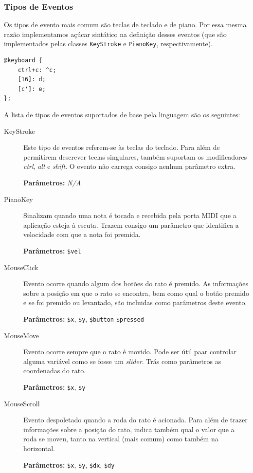 \subsubsection{Tipos de Eventos}
Os tipos de evento mais comum são teclas de teclado e de piano. Por essa mesma razão implementamos açúcar sintático na definição desses eventos  (que são implementados pelas classes \texttt{KeyStroke} e \texttt{PianoKey}, respectivamente).

\begin{lstlisting}[caption={Declaração de três eventos, o primeiro é uma combinação de teclas, o segundo referência o \textit{virtual key code}, e o terceiro uma nota MIDI}]
@keyboard {
    ctrl+c: ^c;
    [16]: d;
    [c']: e;
};
\end{lstlisting}

A lista de tipos de eventos suportados de base pela linguagem são os seguintes:
\begin{description}
 \item[KeyStroke]
 Este tipo de eventos referem-se às teclas do teclado. Para além de permitirem descrever teclas singulares, também suportam os modificadores \textit{ctrl}, \textit{alt} e \textit{shift}. O evento não carrega consigo nenhum parâmetro extra.
 
 \textbf{Parâmetros:} \textit{N/A}
 \item[PianoKey] Sinalizam quando uma nota é tocada e recebida pela porta MIDI que a aplicação esteja à escuta. Trazem consigo um parâmetro que identifica a velocidade com que a nota foi premida.
 
 \textbf{Parâmetros:} \texttt{\$vel}
 \item[MouseClick] Evento ocorre quando algum dos botões do rato é premido. As informações sobre a posição em que o rato se encontra, bem como qual o botão premido e se foi premido ou levantado, são incluidas como parâmetros deste evento.
 
 \textbf{Parâmetros:} \texttt{\$x}, \texttt{\$y}, \texttt{\$button} \texttt{\$pressed}
 \item[MouseMove] Evento ocorre sempre que o rato é movido. Pode ser útil paar controlar alguma variável como se fosse um \textit{slider}. Trás como parâmetros as coordenadas do rato.
 
 \textbf{Parâmetros:} \texttt{\$x}, \texttt{\$y}
 \item[MouseScroll] Evento despoletado quando a roda do rato é acionada. Para além de trazer informações sobre a posição do rato, indica também qual o valor que a roda se moveu, tanto na vertical (mais comum) como também na horizontal.
 
 \textbf{Parâmetros:} \texttt{\$x}, \texttt{\$y}, \texttt{\$dx}, \texttt{\$dy}
\end{description}

